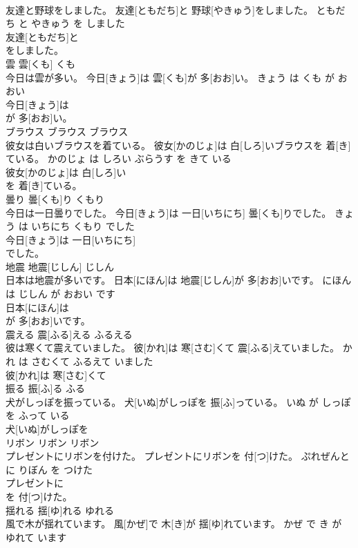 \documentclass[8pt]{extreport}
\begin{document}
\begin{CJK}{UTF8}{min}
\\	友達と野球をしました。	友達[ともだち]と 野球[やきゅう]をしました。	ともだち と やきゅう を しました	
\\	友達[ともだち]と
\\	をしました。			
\\	雲	雲[くも]	くも	
\\	今日は雲が多い。	今日[きょう]は 雲[くも]が 多[おお]い。	きょう は くも が おおい	
\\	今日[きょう]は
\\	が 多[おお]い。			
\\	ブラウス	ブラウス	ブラウス	
\\	彼女は白いブラウスを着ている。	彼女[かのじょ]は 白[しろ]いブラウスを 着[き]ている。	かのじょ は しろい ぶらうす を きて いる	
\\	彼女[かのじょ]は 白[しろ]い
\\	を 着[き]ている。			
\\	曇り	曇[くも]り	くもり	
\\	今日は一日曇りでした。	今日[きょう]は 一日[いちにち] 曇[くも]りでした。	きょう は いちにち くもり でした	
\\	今日[きょう]は 一日[いちにち]
\\	でした。			
\\	地震	地震[じしん]	じしん	
\\	日本は地震が多いです。	日本[にほん]は 地震[じしん]が 多[おお]いです。	にほん は じしん が おおい です	
\\	日本[にほん]は
\\	が 多[おお]いです。			
\\	震える	震[ふる]える	ふるえる	
\\	彼は寒くて震えていました。	彼[かれ]は 寒[さむ]くて 震[ふる]えていました。	かれ は さむくて ふるえて いました	
\\	彼[かれ]は 寒[さむ]くて
\\	振る	振[ふ]る	ふる	
\\	犬がしっぽを振っている。	犬[いぬ]がしっぽを 振[ふ]っている。	いぬ が しっぽ を ふって いる	
\\	犬[いぬ]がしっぽを
\\	リボン	リボン	リボン	
\\	プレゼントにリボンを付けた。	プレゼントにリボンを 付[つ]けた。	ぷれぜんと に りぼん を つけた	
\\	プレゼントに
\\	を 付[つ]けた。			
\\	揺れる	揺[ゆ]れる	ゆれる	
\\	風で木が揺れています。	風[かぜ]で 木[き]が 揺[ゆ]れています。	かぜ で き が ゆれて います	

\end{CJK}
\end{document}
